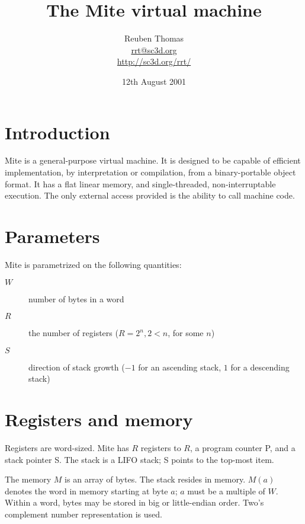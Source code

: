\documentclass[english]{scrartcl}
\newcommand{\synfont}{\sffamily}
\newcommand{\syn}[1]{{\synfont #1}}
\begin{document}
\title{The Mite virtual machine}
\author{Reuben Thomas\\\url{rrt@sc3d.org}\\\url{http://sc3d.org/rrt/}}
\date{12th August 2001}
\maketitle



\section{Introduction}

Mite is a general-purpose virtual machine. It is designed to be
capable of efficient implementation, by interpretation or compilation,
from a binary-portable object format. It has a flat linear memory, and
single-threaded, non-interruptable execution. The only external access
provided is the ability to call machine code.



\section{Parameters}

Mite is parametrized on the following quantities:

\begin{description}
\item[$W$]number of bytes in a word

\item[$R$]the number of registers ($R=2^n, 2<n$, for some $n$)

\item[$S$]direction of stack growth ($-1$ for an ascending stack, $1$
for a descending stack)
\end{description}



\section{Registers and memory}

Registers are word-sized. Mite has $R$ registers \syn{1} to $R$, a
program counter \syn{P}, and a stack pointer \syn{S}. The stack is a
LIFO stack; \syn{S} points to the top-most item.

The memory $M$ is an array of bytes. The stack resides in memory. 
$M(a)$ denotes the word in memory starting at byte $a$; $a$ must be a
multiple of $W$. Within a word, bytes may be stored in big or
little-endian order. Two's complement number representation is used.
\end{document}
